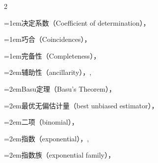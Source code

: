 \begin{multicols}{2}
\par\addvspace{2pt}
\par\noindent\hangindent=1em\hspace*{0em}\label{idx:108}决定系数（Coefficient of determination），\hyperref[idxocc:108:481]{\pageref*{idxocc:108:481}}\par
\par\addvspace{2pt}
\par\noindent\hangindent=1em\hspace*{0em}\label{idx:109}巧合（Coincidences），\hyperref[exercise:3.9]{\pageref*{exercise:3.9}}\par
\par\addvspace{2pt}
\par\noindent\hangindent=1em\hspace*{0em}\label{idx:110}完备性（Completeness），\hyperref[def:6.2.21]{\pageref*{def:6.2.21}}\par
\par\noindent\hangindent=2em\hspace*{1em}\label{idx:111}辅助性（ancillarity），\hyperref[thm:6.2.24]{\pageref*{thm:6.2.24}}, \hyperref[thm:6.6.2]{\pageref*{thm:6.6.2}}\par
\par\noindent\hangindent=2em\hspace*{1em}\label{idx:112}Basu定理（Basu’s Theorem），\hyperref[thm:6.2.24]{\pageref*{thm:6.2.24}}\par
\par\noindent\hangindent=2em\hspace*{1em}\label{idx:113}最优无偏估计量（best unbiased estimator），\hyperref[thm:7.3.23]{\pageref*{thm:7.3.23}}\par
\par\noindent\hangindent=2em\hspace*{1em}\label{idx:114}二项（binomial），\hyperref[ex:6.2.22]{\pageref*{ex:6.2.22}}\par
\par\noindent\hangindent=2em\hspace*{1em}\label{idx:115}指数（exponential），\hyperref[ex:6.2.26]{\pageref*{ex:6.2.26}}, \hyperref[exercise:6.30]{\pageref*{exercise:6.30}}\par
\par\noindent\hangindent=2em\hspace*{1em}\label{idx:116}指数族（exponential family），\hyperref[thm:6.2.25]{\pageref*{thm:6.2.25}}\par

\end{multicols}
